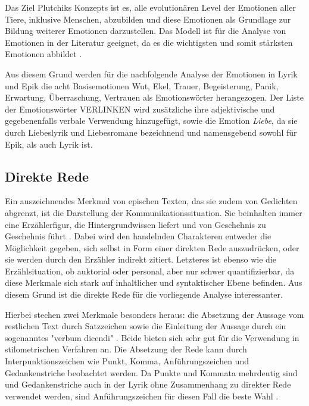 \documentclass[a4paper,10p]{article}
\begin{document}
Das Ziel Plutchiks Konzepts ist es, alle evolutionären Level der Emotionen aller Tiere, inklusive Menschen, abzubilden und diese Emotionen als Grundlage zur Bildung weiterer Emotionen darzustellen. Das Modell ist für die Analyse von Emotionen in der Literatur geeignet, da es die wichtigsten und somit stärksten Emotionen abbildet \citep[vgl.][S. 40-122]{Plutchik}. \par 

Aus diesem Grund werden für die nachfolgende Analyse der Emotionen in Lyrik und Epik die acht Basisemotionen Wut, Ekel, Trauer, Begeisterung, Panik, Erwartung, Überraschung, Vertrauen als Emotionswörter herangezogen. Der Liste der Emotionswörter VERLINKEN wird zusätzliche ihre adjektivische und gegebenenfalls verbale Verwendung hinzugefügt, sowie die Emotion \textit{Liebe}, da sie durch Liebeslyrik und Liebesromane bezeichnend und namensgebend sowohl für Epik, als auch Lyrik ist. 
 

\subsection{Direkte Rede}
Ein auszeichnendes Merkmal von epischen Texten, das sie zudem von Gedichten abgrenzt, ist die Darstellung der Kommunikationssituation. Sie beinhalten immer eine Erzählerfigur, die Hintergrundwissen liefert und von Geschehnis zu Geschehnis führt \citep[vgl.][S. 9]{Bloss2005}. Dabei wird den handelnden Charakteren entweder die Möglichkeit gegeben, sich selbst in Form einer direkten Rede auszudrücken, oder sie werden durch den Erzähler indirekt zitiert. Letzteres ist ebenso wie die Erzählsituation, ob auktorial oder personal, aber nur schwer quantifizierbar, da diese Merkmale sich stark auf inhaltlicher und syntaktischer Ebene befinden. Aus diesem Grund ist die direkte Rede für die vorliegende Analyse interessanter.\par 

Hierbei stechen zwei Merkmale besonders heraus: die Absetzung der Aussage vom restlichen Text durch Satzzeichen sowie die Einleitung der Aussage durch ein sogenanntes "verbum dicendi" \citep[S. 6]{Bloss2005}. Beide bieten sich sehr gut für die Verwendung in stilometrischen Verfahren an. Die Absetzung der Rede kann durch Interpunktionszeichen wie Punkt, Komma, Anführungszeichen und Gedankenstriche beobachtet werden. Da Punkte und Kommata mehrdeutig sind und Gedankenstriche auch in der Lyrik ohne Zusammenhang zu direkter Rede verwendet werden, sind Anführungszeichen für diesen Fall die beste Wahl \citep[vgl.][S. 34]{Bloss2005}.\par 
\end{document}
